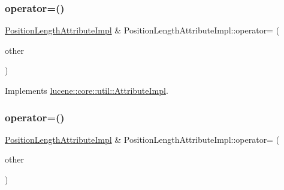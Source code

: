 \subsubsection{\texorpdfstring{operator=()}{operator=()}\hspace{0.1cm}{\footnotesize\ttfamily [1/2]}}
{\footnotesize\ttfamily \mbox{\hyperlink{classlucene_1_1core_1_1analysis_1_1tokenattributes_1_1PositionLengthAttributeImpl}{Position\+Length\+Attribute\+Impl}} \& Position\+Length\+Attribute\+Impl\+::operator= (\begin{DoxyParamCaption}\item[{\mbox{\hyperlink{ZlibCrc32_8h_a2c212835823e3c54a8ab6d95c652660e}{const}} \mbox{\hyperlink{classlucene_1_1core_1_1util_1_1AttributeImpl}{lucene\+::core\+::util\+::\+Attribute\+Impl}} \&}]{other }\end{DoxyParamCaption})\hspace{0.3cm}{\ttfamily [virtual]}}



Implements \mbox{\hyperlink{classlucene_1_1core_1_1util_1_1AttributeImpl_ab032e399d03ce2f58c76881cf2b92325}{lucene\+::core\+::util\+::\+Attribute\+Impl}}.

\mbox{\label{classlucene_1_1core_1_1analysis_1_1tokenattributes_1_1PositionLengthAttributeImpl_a01cf482ffe511eaa7de8b8c19690f4d7}} 
\subsubsection{\texorpdfstring{operator=()}{operator=()}\hspace{0.1cm}{\footnotesize\ttfamily [2/2]}}
{\footnotesize\ttfamily \mbox{\hyperlink{classlucene_1_1core_1_1analysis_1_1tokenattributes_1_1PositionLengthAttributeImpl}{Position\+Length\+Attribute\+Impl}} \& Position\+Length\+Attribute\+Impl\+::operator= (\begin{DoxyParamCaption}\item[{\mbox{\hyperlink{ZlibCrc32_8h_a2c212835823e3c54a8ab6d95c652660e}{const}} \mbox{\hyperlink{classlucene_1_1core_1_1analysis_1_1tokenattributes_1_1PositionLengthAttributeImpl}{Position\+Length\+Attribute\+Impl}} \&}]{other }\end{DoxyParamCaption})}


